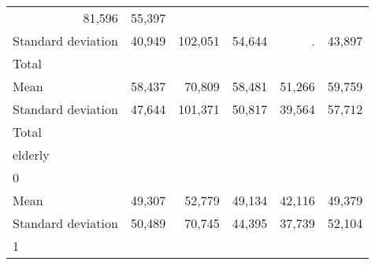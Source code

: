 \begin{tabular}{llllll}
  \multicolumn{1}{r}{81,596} &
  \multicolumn{1}{r}{55,397} \\
\multicolumn{1}{l}{\hspace{4em}Standard deviation} &
  \multicolumn{1}{|r}{40,949} &
  \multicolumn{1}{r}{102,051} &
  \multicolumn{1}{r}{54,644} &
  \multicolumn{1}{r}{.} &
  \multicolumn{1}{r}{43,897} \\
\multicolumn{1}{l}{\hspace{3em}Total} &
  \multicolumn{1}{|r}{} &
  \multicolumn{1}{r}{} &
  \multicolumn{1}{r}{} &
  \multicolumn{1}{r}{} &
  \multicolumn{1}{r}{} \\
\multicolumn{1}{l}{\hspace{4em}Mean} &
  \multicolumn{1}{|r}{58,437} &
  \multicolumn{1}{r}{70,809} &
  \multicolumn{1}{r}{58,481} &
  \multicolumn{1}{r}{51,266} &
  \multicolumn{1}{r}{59,759} \\
\multicolumn{1}{l}{\hspace{4em}Standard deviation} &
  \multicolumn{1}{|r}{47,644} &
  \multicolumn{1}{r}{101,371} &
  \multicolumn{1}{r}{50,817} &
  \multicolumn{1}{r}{39,564} &
  \multicolumn{1}{r}{57,712} \\
\multicolumn{1}{l}{\hspace{1em}Total} &
  \multicolumn{1}{|r}{} &
  \multicolumn{1}{r}{} &
  \multicolumn{1}{r}{} &
  \multicolumn{1}{r}{} &
  \multicolumn{1}{r}{} \\
\multicolumn{1}{l}{\hspace{2em}elderly} &
  \multicolumn{1}{|r}{} &
  \multicolumn{1}{r}{} &
  \multicolumn{1}{r}{} &
  \multicolumn{1}{r}{} &
  \multicolumn{1}{r}{} \\
\multicolumn{1}{l}{\hspace{3em}0} &
  \multicolumn{1}{|r}{} &
  \multicolumn{1}{r}{} &
  \multicolumn{1}{r}{} &
  \multicolumn{1}{r}{} &
  \multicolumn{1}{r}{} \\
\multicolumn{1}{l}{\hspace{4em}Mean} &
  \multicolumn{1}{|r}{49,307} &
  \multicolumn{1}{r}{52,779} &
  \multicolumn{1}{r}{49,134} &
  \multicolumn{1}{r}{42,116} &
  \multicolumn{1}{r}{49,379} \\
\multicolumn{1}{l}{\hspace{4em}Standard deviation} &
  \multicolumn{1}{|r}{50,489} &
  \multicolumn{1}{r}{70,745} &
  \multicolumn{1}{r}{44,395} &
  \multicolumn{1}{r}{37,739} &
  \multicolumn{1}{r}{52,104} \\
\multicolumn{1}{l}{\hspace{3em}1} &
  \multicolumn{1}{|r}{} &

\end{tabular}
